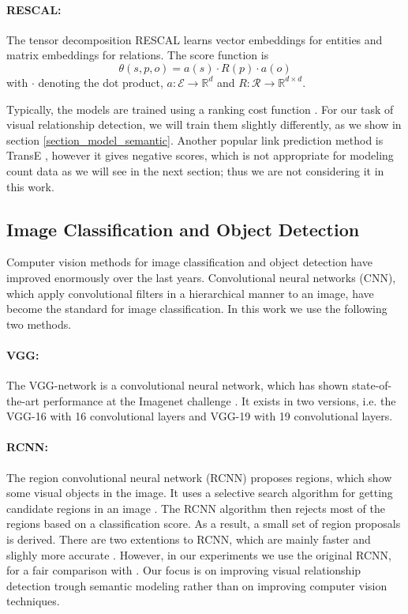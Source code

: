 \documentclass[runningheads,a4paper]{llncs}
\begin{document}
\paragraph{RESCAL:} The tensor decomposition RESCAL \cite{Rescal} learns vector embeddings for entities and matrix embeddings for relations. The score function is
\begin{equation}
\label{eq_link_last}
\theta(s,p,o) = a(s) \cdot R(p) \cdot a(o)
\end{equation}
with $\cdot$ denoting the dot product, $a: \mathcal{E} \rightarrow \mathbb{R}^d$ and $R: \mathcal{R} \rightarrow \mathbb{R}^{d \times d}$.

Typically, the models are trained using a ranking cost function \cite{relational_review}. For our task of visual relationship detection, we will train them slightly differently, as we show in section \ref{section_model_semantic}. Another popular link prediction method is TransE \cite{transe}, however it gives negative scores, which is not appropriate for modeling count data as we will see in the next section; thus we are not considering it in this work.

\subsection{Image Classification and Object Detection}

Computer vision methods for image classification and object detection have improved enormously over the last years. Convolutional neural networks (CNN), which apply convolutional filters in a hierarchical manner to an image, have become the standard for image classification. In this work we use the following two methods.

\paragraph{VGG:} The VGG-network is a convolutional neural network, which has shown state-of-the-art performance at the Imagenet challenge \cite{vgg}. It exists in two versions, i.e. the VGG-16 with 16 convolutional layers and VGG-19 with 19 convolutional layers.

\paragraph{RCNN:} The region convolutional neural network (RCNN) \cite{rcnn} proposes regions, which show some visual objects in the image. It uses a selective search algorithm for getting candidate regions in an image \cite{selective_search}. The RCNN algorithm then rejects most of the regions based on a classification score. As a result, a small set of region proposals is derived. There are two extentions to RCNN, which are mainly faster and slighly more accurate \cite{fast_rcnn} \cite{faster_rcnn}. However, in our experiments we use the original RCNN, for a fair comparison with \cite{visual}. Our focus is on improving visual relationship detection trough semantic modeling rather than on improving computer vision techniques.
\end{document}

